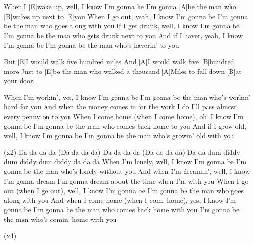 

\begin{guitar}
	When I [E]wake up, well, I know I'm gonna be
	I'm gonna [A]be the man who [B]wakes up next to [E]you
	When I go out, yeah, I know I'm gonna be
	I'm gonna be the man who goes along with you
	If I get drunk, well, I know I'm gonna be
	I'm gonna be the man who gets drunk next to you
	And if I haver, yeah, I know I'm gonna be
	I'm gonna be the man who's haverin' to you
	
	But [E]I would walk five hundred miles
	And [A]I would walk five [B]hundred more
	Just to [E]be the man who walked a thousand
	[A]Miles to fall down [B]at your door
	
	When I'm workin', yes, I know I'm gonna be
	I'm gonna be the man who's workin' hard for you
	And when the money comes in for the work I do
	I'll pass almost every penny on to you
	When I come home (when I come home), oh, I know I'm gonna be
	I'm gonna be the man who comes back home to you
	And if I grow old, well, I know I'm gonna be
	I'm gonna be the man who's growin' old with you
	
	 
	
	 (x2)
	Da-da da da (Da-da da da)
	Da-da da da (Da-da da da)
	Da-da dum diddy dum diddy dum diddy da da da
	\pagebreak
	When I'm lonely, well, I know I'm gonna be
	I'm gonna be the man who's lonely without you
	And when I'm dreamin', well, I know I'm gonna dream
	I'm gonna dream about the time when I'm with you
	When I go out (when I go out), well, I know I'm gonna be
	I'm gonna be the man who goes along with you
	And when I come home (when I come home), yes, I know I'm gonna be
	I'm gonna be the man who comes back home with you
	I'm gonna be the man who's comin' home with you
	
	 
	
	  (x4)
	
	 
\end{guitar}